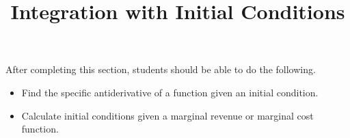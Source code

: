\documentclass{ximera}
\title{Integration with Initial Conditions}
\begin{document}
\begin{abstract}
\end{abstract}

\maketitle

\begin{sectionOutcomes}
After completing this section, students should be able to do the following.

\begin{itemize}
\item Find the specific antiderivative of a function given an initial condition.
\item Calculate initial conditions given a marginal revenue or marginal cost function.
\end{itemize}
\end{sectionOutcomes}
\end{document}
